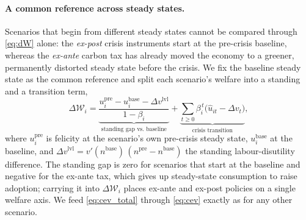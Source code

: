 \paragraph{A common reference across steady states.} Scenarios that begin from
different steady states cannot be compared through \eqref{eq:dW} alone: the
\emph{ex-post} crisis instruments start at the pre-crisis baseline, whereas the
\emph{ex-ante} carbon tax has already moved the economy to a greener, permanently
distorted steady state before the crisis. We fix the baseline steady state as the
common reference and split each scenario's welfare into a standing and a transition
term,
%
\begin{equation}
  \Delta\mathcal{W}_i=
  \underbrace{\frac{u^{\mathrm{pre}}_i-u^{\mathrm{base}}_i-\Delta v^{\mathrm{lvl}}}{1-\beta_i}}_{\text{standing gap vs.\ baseline}}
  +\underbrace{\sum_{t\ge0}\beta_i^{\,t}\bigl(\widehat{u}_{it}-\Delta v_t\bigr)}_{\text{crisis transition}},
  \label{eq:cev_total}
\end{equation}
%
where $u^{\mathrm{pre}}_i$ is felicity at the scenario's own pre-crisis steady state,
$u^{\mathrm{base}}_i$ at the baseline, and
$\Delta v^{\mathrm{lvl}}=v'(n^{\mathrm{base}})\,(n^{\mathrm{pre}}-n^{\mathrm{base}})$
the standing labour-disutility difference. The standing gap is zero for scenarios
that start at the baseline and negative for the ex-ante tax, which gives up
steady-state consumption to raise adoption; carrying it into $\Delta\mathcal{W}_i$
places ex-ante and ex-post policies on a single welfare axis. We feed
\eqref{eq:cev_total} through \eqref{eq:cev} exactly as for any other scenario.

